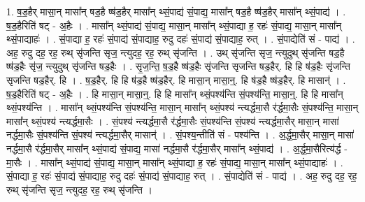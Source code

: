 \documentclass[17pt]{extarticle}
\begin{document}
1. ष॒ड॒हैर् मासा॒न् मासा᳚न् षड॒है ष्ष॑ड॒हैर् मासा᳚न् थ्सं॒पाद्य॑ सं॒पाद्य॒ मासा᳚न् षड॒है ष्ष॑ड॒हैर् मासा᳚न् थ्सं॒पाद्य॑ । . ष॒ड॒हैरिति॑ षट् - अ॒हैः । . मासा᳚न् थ्सं॒पाद्य॑ सं॒पाद्य॒ मासा॒न् मासा᳚न् थ्सं॒पाद्या ह॒ रहः॑ सं॒पाद्य॒ मासा॒न् मासा᳚न् थ्सं॒पाद्याहः॑ । . सं॒पाद्या ह॒ रहः॑ सं॒पाद्य॑ सं॒पाद्याह॒ रुदु दहः॑ सं॒पाद्य॑ सं॒पाद्याह॒ रुत् । . सं॒पाद्येति॑ सं - पाद्य॑ । . अह॒ रुदु दह॒ रह॒ रुथ् सृ॑जन्ति सृज॒ न्त्युदह॒ रह॒ रुथ् सृ॑जन्ति । . उथ् सृ॑जन्ति सृज॒ न्त्युदुथ् सृ॑जन्ति षड॒है ष्ष॑ड॒हैः सृ॑ज॒ न्त्युदुथ् सृ॑जन्ति षड॒हैः । . सृ॒ज॒न्ति॒ ष॒ड॒है ष्ष॑ड॒हैः सृ॑जन्ति सृजन्ति षड॒हैर्. हि हि ष॑ड॒हैः सृ॑जन्ति सृजन्ति षड॒हैर्. हि । . ष॒ड॒हैर्. हि हि ष॑ड॒है ष्ष॑ड॒हैर्. हि मासा॒न् मासा॒न्॒. हि ष॑ड॒है ष्ष॑ड॒हैर्. हि मासान्॑ । . ष॒ड॒हैरिति॑ षट् - अ॒हैः । . हि मासा॒न् मासा॒न्॒. हि हि मासा᳚न् थ्सं॒पश्य॑न्ति सं॒पश्य॑न्ति॒ मासा॒न्॒. हि हि मासा᳚न् थ्सं॒पश्य॑न्ति । . मासा᳚न् थ्सं॒पश्य॑न्ति सं॒पश्य॑न्ति॒ मासा॒न् मासा᳚न् थ्सं॒पश्य॑ न्त्यर्द्धमा॒सै र॑र्द्धमा॒सैः सं॒पश्य॑न्ति॒ मासा॒न् मासा᳚न् थ्सं॒पश्य॑ न्त्यर्द्धमा॒सैः । . सं॒पश्य॑ न्त्यर्द्धमा॒सै र॑र्द्धमा॒सैः सं॒पश्य॑न्ति सं॒पश्य॑ न्त्यर्द्धमा॒सैर् मासा॒न् मासा॑ नर्द्धमा॒सैः सं॒पश्य॑न्ति सं॒पश्य॑ न्त्यर्द्धमा॒सैर् मासान्॑ । . सं॒पश्य॒न्तीति॑ सं - पश्य॑न्ति । . अ॒र्द्ध॒मा॒सैर् मासा॒न् मासा॑ नर्द्धमा॒सै र॑र्द्धमा॒सैर् मासा᳚न् थ्सं॒पाद्य॑ सं॒पाद्य॒ मासा॑ नर्द्धमा॒सै र॑र्द्धमा॒सैर् मासा᳚न् थ्सं॒पाद्य॑ । . अ॒र्द्ध॒मा॒सैरित्य॑र्द्ध - मा॒सैः । . मासा᳚न् थ्सं॒पाद्य॑ सं॒पाद्य॒ मासा॒न् मासा᳚न् थ्सं॒पाद्या ह॒ रहः॑ सं॒पाद्य॒ मासा॒न् मासा᳚न् थ्सं॒पाद्याहः॑ । . सं॒पाद्या ह॒ रहः॑ सं॒पाद्य॑ सं॒पाद्याह॒ रुदु दहः॑ सं॒पाद्य॑ सं॒पाद्याह॒ रुत् । . सं॒पाद्येति॑ सं - पाद्य॑ । . अह॒ रुदु दह॒ रह॒ रुथ् सृ॑जन्ति सृज॒ न्त्युदह॒ रह॒ रुथ् सृ॑जन्ति । \newline
\end{document}
